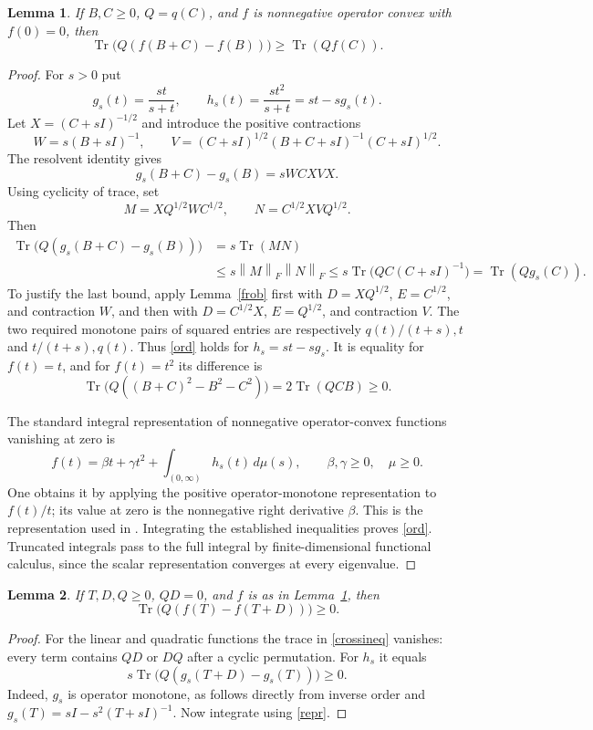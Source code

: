 \documentclass[11pt]{article}
\newtheorem{lemma}{Lemma}
\newcommand{\Tr}{\operatorname{Tr}}
\newcommand{\nn}[1]{\left\lVert#1\right\rVert}
\begin{document}
\begin{lemma}\label{ordered}
If $B,C\geq0$, $Q=q(C)$, and $f$ is nonnegative operator convex
with $f(0)=0$, then
\begin{equation}\label{ord}
 \Tr\bigl(Q(f(B+C)-f(B))\bigr)\geq\Tr(Qf(C)).
\end{equation}
\end{lemma}
\begin{proof}
For $s>0$ put
\[
 g_s(t)=\frac{st}{s+t},\qquad
 h_s(t)=\frac{st^2}{s+t}=st-sg_s(t).
\]
Let $X=(C+sI)^{-1/2}$ and introduce the positive contractions
\[
 W=s(B+sI)^{-1},\qquad
 V=(C+sI)^{1/2}(B+C+sI)^{-1}(C+sI)^{1/2}.
\]
The resolvent identity gives
\[
 g_s(B+C)-g_s(B)=sWCXVX.
\]
Using cyclicity of trace, set
\[
 M=XQ^{1/2}WC^{1/2},\qquad N=C^{1/2}XVQ^{1/2}.
\]
Then
\begin{align*}
 \Tr\bigl(Q(g_s(B+C)-g_s(B))\bigr)
 &=s\Tr(MN)\\
 &\leq s\nn{M}_F\nn{N}_F
 \leq s\Tr\bigl(QC(C+sI)^{-1}\bigr)=\Tr(Qg_s(C)).
\end{align*}
To justify the last bound, apply Lemma~\ref{frob} first with
$D=XQ^{1/2}$, $E=C^{1/2}$, and contraction $W$, and then with
$D=C^{1/2}X$, $E=Q^{1/2}$, and contraction $V$.
The two required monotone pairs of squared entries are respectively
$q(t)/(t+s),t$ and $t/(t+s),q(t)$.
Thus \eqref{ord} holds for $h_s=st-sg_s$.
It is equality for $f(t)=t$, and for $f(t)=t^2$ its difference is
\[
 \Tr\bigl(Q((B+C)^2-B^2-C^2)\bigr)=2\Tr(QCB)\geq0.
\]

The standard integral representation of nonnegative operator-convex
functions vanishing at zero is
\begin{equation}\label{repr}
 f(t)=\beta t+\gamma t^2+\int_{(0,\infty)}h_s(t)\,d\mu(s),
 \qquad \beta,\gamma\geq0,\quad \mu\geq0.
\end{equation}
One obtains it by applying the positive operator-monotone
representation to $f(t)/t$; its value at zero is the nonnegative
right derivative $\beta$. This is the representation used in
\cite{DHLV}. Integrating the established inequalities proves
\eqref{ord}. Truncated integrals pass to the full integral by
finite-dimensional functional calculus, since the scalar
representation converges at every eigenvalue.
\end{proof}

\begin{lemma}\label{cross}
If $T,D,Q\geq0$, $QD=0$, and $f$ is as in Lemma~\ref{ordered}, then
\begin{equation}\label{crossineq}
 \Tr\bigl(Q(f(T)-f(T+D))\bigr)\geq0.
\end{equation}
\end{lemma}
\begin{proof}
For the linear and quadratic functions the trace in
\eqref{crossineq} vanishes: every term contains $QD$ or $DQ$
after a cyclic permutation. For $h_s$ it equals
\[
 s\Tr\bigl(Q(g_s(T+D)-g_s(T))\bigr)\geq0.
\]
Indeed, $g_s$ is operator monotone, as follows directly from
inverse order and $g_s(T)=sI-s^2(T+sI)^{-1}$.
Now integrate using \eqref{repr}.
\end{proof}
\end{document}
